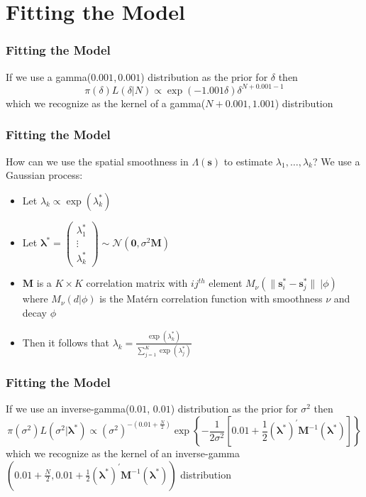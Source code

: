 \documentclass[10pt, compress]{beamer}
\begin{document}
  \section{Fitting the Model}
  \begin{frame}
    \frametitle{Fitting the Model}
      If we use a gamma($0.001, 0.001$) distribution as the prior for $\delta$ 
      then 
    $$ \pi(\delta)L(\delta|N) \propto \exp(-1.001\delta)\delta^{N+0.001-1}$$
    which we recognize as the kernel of a gamma($N+0.001, 1.001$) distribution
  \end{frame}
  \begin{frame}
    \frametitle{Fitting the Model}
    How can we use the spatial smoothness in $\Lambda(\mathbf{s})$ to estimate $\lambda_1, \dots, \lambda_k$?
    \pause
    \newline
    \newline
    We use a Gaussian process:
    \begin{itemize}
      \item Let $\lambda_k \propto \exp(\lambda_k^{*})$
      \item Let $\boldsymbol{\lambda}^{*} = \begin{pmatrix} \lambda_1^{*} \\ \vdots \\ \lambda_k^{*} \end{pmatrix} \sim \mathcal{N}(\mathbf{0}, \sigma^2\mathbf{M})$
      \item $\mathbf{M}$ is a $K \times K$ correlation matrix with $ij^{th}$ element $M_{\nu}(\|\mathbf{s}_i^{*}-\mathbf{s}_j^{*}\|~| \phi)$ where $M_{\nu}(d | \phi)$
            is the Mat\'{e}rn correlation function with smoothness $\nu$ and decay $\phi$
      \item Then it follows that $\lambda_k = \frac{\exp(\lambda_k^{*})}{\sum_{j=1}^{K}\exp(\lambda_j^{*})}$

    \end{itemize}
  \end{frame}
  \begin{frame}
    \frametitle{Fitting the Model}
    If we use an inverse-gamma($0.01$, $0.01$) distribution as the prior for $\sigma^2$ then 
    $$ \pi(\sigma^2)L(\sigma^2|\boldsymbol\lambda^{*}) \propto 
      (\sigma^2)^{-(0.01+\frac{N}{2})}\exp\left\{-\frac{1}{2\sigma^2}\left[0.01+\frac{1}{2}(\boldsymbol\lambda^{*})^{'}\mathbf{M}^{-1}(\boldsymbol\lambda^{*})\right]\right\}
    $$
    which we recognize as the kernel of an inverse-gamma$(0.01+\frac{N}{2}, 0.01+\frac{1}{2}(\boldsymbol\lambda^{*})^{'}\mathbf{M}^{-1}(\boldsymbol\lambda^{*}))$
    distribution
  \end{frame}
\end{document}
